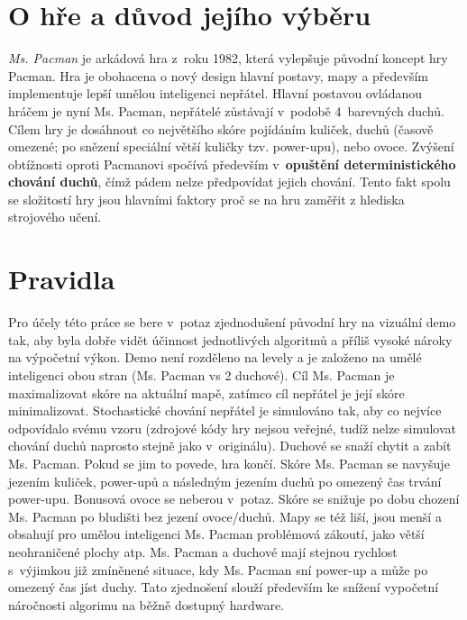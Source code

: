 \section{O hře a důvod jejího výběru}
\textit{Ms. Pacman} je arkádová hra z roku 1982, která vylepšuje původní koncept hry Pacman. Hra je obohacena o nový design hlavní postavy, mapy a především implementuje lepší umělou inteligenci nepřátel. Hlavní postavou ovládanou hráčem je nyní Ms. Pacman, nepřátelé zůstávají v podobě 4 barevných duchů. Cílem hry je dosáhnout co největšího skóre pojídáním kuliček, duchů (časově omezené; po snězení speciální větší kuličky tzv. power-upu), nebo ovoce.
Zvýšení obtížnosti oproti Pacmanovi spočívá především v \textbf{opuštění deterministického chování duchů}, čímž pádem nelze předpovídat jejich chování. Tento fakt spolu se složitostí hry jsou hlavními faktory proč se na hru zaměřit z hlediska strojového učení.
\section{Pravidla}
Pro účely této práce se bere v potaz zjednodušení původní hry na vizuální demo tak, aby byla dobře vidět účinnost jednotlivých algoritmů a příliš vysoké nároky na výpočetní výkon. Demo není rozděleno na levely a je založeno na umělé inteligenci obou stran (Ms. Pacman vs 2 duchové). Cíl Ms. Pacman je maximalizovat skóre na aktuální mapě, zatímco cíl nepřátel je její skóre minimalizovat. Stochastické chování nepřátel je simulováno tak, aby co nejvíce odpovídalo svému vzoru (zdrojové kódy hry nejsou veřejné, tudíž nelze simulovat chování duchů naprosto stejně jako v originálu). Duchové se snaží chytit a zabít Ms. Pacman. Pokud se jim to povede, hra končí. Skóre Ms. Pacman se navyšuje jezením kuliček, power-upů a následným jezením duchů po omezený čas trvání power-upu. Bonusová ovoce se neberou v potaz. Skóre se snižuje po dobu chození Ms. Pacman po bludišti bez jezení ovoce/duchů. Mapy se též liší, jsou menší a obsahují pro umělou inteligenci Ms. Pacman problémová zákoutí, jako větší neohraničené plochy atp. Ms. Pacman a duchové mají stejnou rychlost s výjimkou již zmíněnené situace, kdy Ms. Pacman sní power-up a může po omezený čas jíst duchy. Tato zjednošení slouží především ke snížení vypočetní náročnosti algorimu na běžně dostupný hardware.
